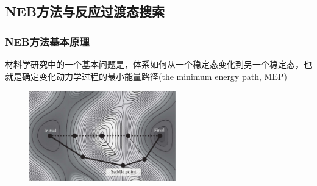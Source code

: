 \subsection{\rm{NEB}方法与反应过渡态搜索}
\frame
{
	\frametitle{\textrm{NEB}方法基本原理}
材料学研究中的一个基本问题是，体系如何从一个稳定态变化到另一个稳定态，也就是确定变化动力学过程的最小能量路径\textrm{(the minimum energy path, MEP)}%
\vskip 5pt
{\fontsize{7.2pt}{5.2pt}}
\begin{figure}[h!]
	\vskip -10pt
\centering
\includegraphics[width=2.5in,viewport=0 0 770 530,clip]{Figures/Pt_NEB.png}
\caption{\fontsize{7.2pt}{5.2pt}}%
\label{Pt_NEB}
\end{figure}
}
